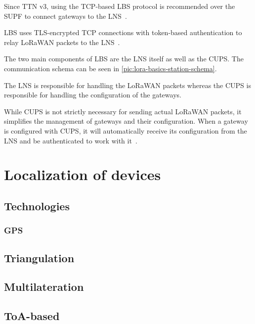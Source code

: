 Since \ac{TTN} v3, using the \ac{TCP}-based \acl{LBS} protocol is recommended over the \ac{SUPF} to connect gateways to the \ac{LNS}~\cite{the_things_industries_bv_semtech_2022}.

\ac{LBS} uses \ac{TLS}-encrypted \ac{TCP} connections with token-based authentication to relay \ac{LoRaWAN} packets to the \ac{LNS}~\cite{the_things_industries_bv_lora_2022}.

The two main components of \acl{LBS} are the \ac{LNS} itself as well as the \acf{CUPS}.
The communication schema can be seen in \cref{pic:lora-basics-station-schema}.

The \ac{LNS} is responsible for handling the \ac{LoRaWAN} packets whereas the \acl{CUPS} is responsible for handling the configuration of the gateways.

While \ac{CUPS} is not strictly necessary for sending actual \ac{LoRaWAN} packets, it simplifies the management of gateways and their configuration.
When a gateway is configured with \ac{CUPS}, it will automatically receive its configuration from the \ac{LNS} and be authenticated to work with it~\cite{the_things_industries_bv_lora_2022}.

\section{Localization of devices}

\subsection{Technologies}

\subsubsection{\ac{GPS}}


\subsection{Triangulation}

\subsection{Multilateration}

\subsection{\acs{ToA}-based}

